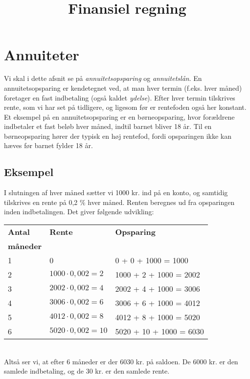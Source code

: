 \documentclass[12pt,oneside,a4paper]{article}
\title{Finansiel regning}
\date{\vspace{-5ex}}
\begin{document}
\maketitle


\section{Annuiteter}
Vi skal i dette afsnit se på \emph{annuitetsopsparing} og \emph{annuitetslån}.
En annuitetsopsparing er kendetegnet ved, at man hver termin (f.eks. hver
måned) foretager en fast indbetaling (også kaldet \emph{ydelse}). Efter hver
termin tilskrives rente, som vi har set på tidligere, og ligesom før er
rentefoden også her konstant. Et eksempel på en annuitetsopsparing er en
børneopsparing, hvor forældrene indbetaler et fast beløb hver måned, indtil
barnet bliver 18 år. Til en børneopsparing hører der typisk en høj rentefod,
fordi opsparingen ikke kan hæves før barnet fylder 18 år.

\begin{tcolorbox}
\subsection{Eksempel}
I slutningen af hver måned sætter vi 1000 kr. ind på en konto, og samtidig
tilskrives en rente på 0,2 $\%$ hver måned. Renten beregnes ud fra
opsparingen inden indbetalingen.  Det giver følgende udvikling:
\\

\begin{tabular}{|l|l|l|}
    \hline
    \textbf{Antal} & \textbf{Rente} & \textbf{Opsparing} \\
    \textbf{måneder} &  & \\
    \hline
    1 & 0 & 0 + 0 + 1000 = 1000 \\
    \hline
    2 & $1000\cdot 0,002 = 2$ & 1000 + 2 + 1000 = 2002 \\
    \hline
    3 & $2002\cdot 0,002 = 4$ & 2002 + 4 + 1000 = 3006 \\
    \hline
    4 & $3006\cdot 0,002 = 6$ & 3006 + 6 + 1000 = 4012 \\
    \hline
    5 & $4012\cdot 0,002 = 8$ & 4012 + 8 + 1000 = 5020 \\
    \hline
    6 & $5020\cdot 0,002 = 10$ & 5020 + 10 + 1000 = 6030 \\
    \hline
\end{tabular}
\\

Altså ser vi, at efter 6 måneder er der 6030 kr. på saldoen. De 6000 kr. er den
samlede indbetaling, og de 30 kr. er den samlede rente.
\end{tcolorbox}
\end{document}
